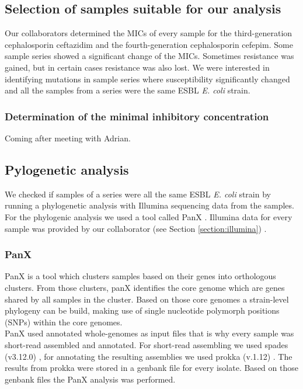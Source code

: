 \subsection{Selection of samples suitable for our analysis}
Our collaborators determined the MICs of every sample for the third-generation cephalosporin ceftazidim and the fourth-generation cephalosporin cefepim. Some sample series showed a significant change of the MICs. Sometimes resistance was gained, but in certain cases resistance was also lost. We were interested in identifying mutations in sample series where susceptibility significantly changed and all the samples from a series were the same ESBL \textit{E. coli} strain.
\subsubsection{Determination of the minimal inhibitory concentration}
Coming after meeting with Adrian.

\subsection{Pylogenetic analysis}
We checked if samples of a series were all the same ESBL \textit{E. coli} strain by running a phylogenetic analysis with Illumina sequencing data from the samples. For the phylogenic analysis we used a tool called PanX \cite{ding_panx:_2018}. Illumina data for every sample was provided by our collaborator (see Section \ref{section:illumina}) .

\subsubsection{PanX}
PanX is a tool which clusters samples based on their genes into orthologous clusters. From those clusters, panX identifies the core genome which are genes shared by all samples in the cluster. Based on those core genomes a strain-level phylogeny can be build, making use of single nucleotide polymorph positions (SNPs) within the core genomes. \\ 
PanX used annotated whole-genomes as input files that is why every sample was short-read assembled and annotated. For short-read assembling we used spades (v3.12.0) \cite{nurk_assembling_2013}, for annotating the resulting assemblies we used prokka (v.1.12) \cite{seemann_prokka:_2014}. The results from prokka were stored in a genbank file for every isolate. Based on those genbank files the PanX analysis was performed. \\


